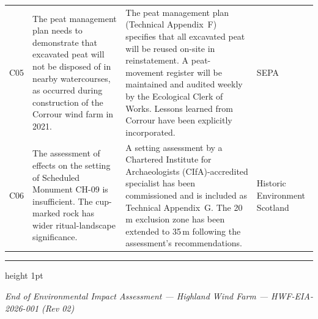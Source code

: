 \begin{tabularx}{\linewidth}{@{}c >{\raggedright\arraybackslash}p{3.5cm} >{\raggedright\arraybackslash}X >{\raggedright\arraybackslash}p{3.5cm} @{}}
\rowcolor{rowshade}
C05 & The peat management plan needs to demonstrate that excavated peat will not be disposed of in nearby watercourses, as occurred during construction of the Corrour wind farm in 2021. & The peat management plan (Technical Appendix~F) specifies that all excavated peat will be reused on-site in reinstatement. A peat-movement register will be maintained and audited weekly by the Ecological Clerk of Works. Lessons learned from Corrour have been explicitly incorporated. & SEPA \\
C06 & The assessment of effects on the setting of Scheduled Monument CH-09 is insufficient. The cup-marked rock has wider ritual-landscape significance. & A setting assessment by a Chartered Institute for Archaeologists (CIfA)-accredited specialist has been commissioned and is included as Technical Appendix~G. The 20\,m exclusion zone has been extended to 35\,m following the assessment's recommendations. & Historic Environment Scotland \\
\bottomrule
\end{tabularx}

\vspace{14pt}
{\color{accent}\hrule height 1pt}
\vspace{6pt}
\begin{center}
{\footnotesize\color{medium}\textit{End of Environmental Impact Assessment --- Highland Wind Farm --- HWF-EIA-2026-001 (Rev 02)}}
\end{center}
